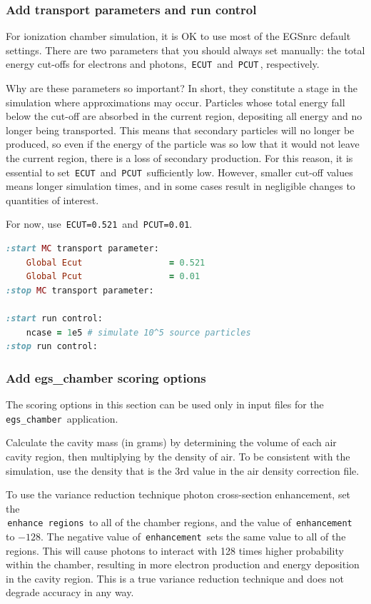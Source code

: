 \documentclass[12pt,twoside]{article}
\begin{document}
\subsubsection{Add transport parameters and run control}
For ionization chamber simulation, it is OK to use most of the EGSnrc default
settings. There are two parameters that you should always set manually:
the total energy cut-offs for electrons and photons, \,\Verb|ECUT|\,
and \,\Verb|PCUT|\,, respectively.

Why are these parameters so important? In short, they constitute a stage in the
simulation where approximations may occur. Particles whose total energy fall
below the cut-off are absorbed in the current region, depositing all energy
and no longer being transported. This means that secondary particles will no
longer be produced, so even if the energy of the particle was so low that it
would not leave the current region, there is a loss of secondary production. For
this reason, it is essential to set \,\Verb|ECUT|\, and \,\Verb|PCUT|\,
sufficiently low. However, smaller cut-off values means longer simulation times,
and in some cases result in negligible changes to quantities of interest.

For now, use \,\Verb|ECUT=0.521|\, and \,\Verb|PCUT=0.01|.

{\small
\begin{lstlisting}[language=ruby,backgroundcolor=\color{white}]
:start MC transport parameter:
    Global Ecut                 = 0.521
    Global Pcut                 = 0.01
:stop MC transport parameter:

:start run control:
    ncase = 1e5 # simulate 10^5 source particles
:stop run control:
\end{lstlisting}
}

\subsubsection{Add egs\_chamber scoring options}
The scoring options in this section can be used only in input files for the
\,\Verb|egs_chamber|\, application.

Calculate the cavity mass (in grams) by determining the volume of each air cavity region,
then multiplying by the density of air. To be consistent with the simulation,
use the density that is the 3rd value in the air density correction file.

To use the variance reduction technique photon cross-section enhancement, set
the \\
\,\Verb|enhance regions|\, to all of the chamber regions, and the value of
\,\Verb|enhancement|\, to $-128$. The negative value of \,\Verb|enhancement|\,
sets the same value to all of the regions. This will cause photons to interact
with 128 times higher probability within the chamber, resulting in more
electron production and energy deposition in the cavity region. This is a true
variance reduction technique and does not degrade accuracy in any way.
\end{document}
